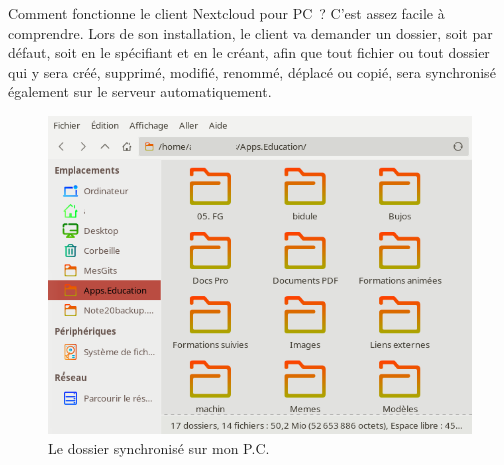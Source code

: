 Comment fonctionne le client Nextcloud pour PC~? 
C'est assez facile à comprendre. 
Lors de son installation, le client va demander un dossier, soit par défaut, soit en le spécifiant et en le créant, afin que tout fichier ou tout dossier qui y sera créé, supprimé, modifié, renommé, déplacé ou copié, sera synchronisé également sur le serveur automatiquement.
\begin{figure} \label{fig-dossier-synchro}
	\centering
	\includegraphics{./Captures/nextcloud-client.dossier.synchronise.png}
	\caption{Le dossier synchronisé sur mon P.C.}
\end{figure}

